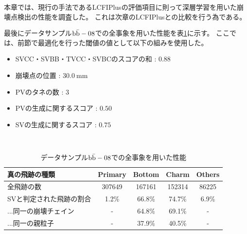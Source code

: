 本章では、現行の手法であるLCFIPlusの評価項目に則って深層学習を用いた崩壊点検出の性能を調査した。
これは次章のLCFIPlusとの比較を行う為である。

最後にデータサンプル$\rm b\bar{b}-08$での全事象を用いた性能を表\ref{PerformanceofAllEvents}に示す。
ここでは、前節で最適化を行った閾値の値として以下の組みを使用した。

\begin{itemize}
 \item SVCC・SVBB・TVCC・SVBCのスコアの和 : $0.88$
 \item 崩壊点の位置 : $30.0\ {\mathrm{mm}}$
 \item PVのタネの数 : $3$
 \item PVの生成に関するスコア : $0.50$
 \item SVの生成に関するスコア : $0.75$
\end{itemize}

\begin{table}[htb]
 \centering
　\small
  \begin{tabular}{l c c c c} \hline
    真の飛跡の種類 & Primary & Bottom & Charm & Others\\ \hline
    全飛跡の数 & 307649 & 167161 & 152314 & 86225\\
    SVと判定された飛跡の割合 & 1.2\% & 66.8\% & 74.7\% & 6.9\%\\
    ...同一の崩壊チェイン & - & 64.8\% & 69.1\% & - \\
    ...同一の親粒子 & - & 37.9\% & 40.5\% & - \\\hline
  \end{tabular}
  \caption{データサンプル$\rm b\bar{b}-08$での全事象を用いた性能}
  \label{PerformanceofAllEvents}
\end{table}




























